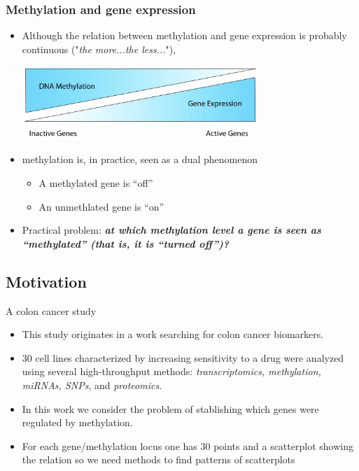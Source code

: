 \documentclass[handout]{beamer}
\begin{document}
\begin{frame}[fragile]\frametitle{Methylation and gene expression}
\begin{itemize}
\item Although the relation between methylation and gene expression is probably continuous ("\emph{the more...the less...}"), 
\begin{center}
\includegraphics[width=0.7\textwidth]{./images/DNA-Methylation-and-Gene-Expression-Relationship.jpg}
\end{center}
\item methylation is, in practice, seen as a dual phenomenon
\begin{itemize}
\item A methylated gene is ``off''
\item An unmethlated gene is ``on''
\end{itemize} 
\item Practical problem: \textbf{\emph{at which methylation level a gene is seen as ``methylated'' (that is, it is ``turned off'')?}}
\end{itemize} 

\end{frame}


\subsection{Motivation}
\begin{frame}{A colon cancer study}
  \begin{itemize}
  \item This study originates in a work searching for colon cancer biomarkers.
  \item 30 cell lines characterized by increasing sensitivity to a drug were analyzed using several high-throughput methods:\emph{ transcriptomics, methylation, miRNAs, SNPs}, and \emph{proteomics}.
\item In this work we consider the problem of stablishing which genes were regulated by methylation.
\item For each gene/methylation locus one has 30 points and a scatterplot showing the relation so we need methods to find patterns of scatterplots
  \end{itemize}
\end{frame}
\end{document}
